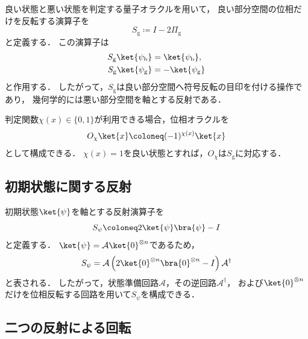 良い状態と悪い状態を判定する量子オラクルを用いて，
良い部分空間の位相だけを反転する演算子を
\begin{equation}
  S_{\mathrm{g}}
  \coloneq
  I-2\Pi_{\mathrm{g}}
  \label{eq:good-state-reflection}
\end{equation}
と定義する．
この演算子は
\begin{align*}
  S_{\mathrm{g}}\ket{\psi_{\mathrm{b}}}
  &=
  \ket{\psi_{\mathrm{b}}},\\
  S_{\mathrm{g}}\ket{\psi_{\mathrm{g}}}
  &=
  -\ket{\psi_{\mathrm{g}}}
\end{align*}
と作用する．
したがって，$S_{\mathrm{g}}$は良い部分空間へ符号反転の目印を付ける操作であり，
幾何学的には悪い部分空間を軸とする反射である．

判定関数$\chi(x)\in\{0,1\}$が利用できる場合，位相オラクルを
\begin{equation}
  O_{\chi}\ket{x}
  \coloneq
  (-1)^{\chi(x)}\ket{x}
  \label{eq:phase-oracle}
\end{equation}
として構成できる．
$\chi(x)=1$を良い状態とすれば，$O_{\chi}$は$S_{\mathrm{g}}$に対応する．

\subsection{初期状態に関する反射}
\label{subsec:initial-state-reflection}

初期状態$\ket{\psi}$を軸とする反射演算子を
\begin{equation}
  S_{\psi}
  \coloneq
  2\ket{\psi}\bra{\psi}-I
  \label{eq:initial-state-reflection}
\end{equation}
と定義する．
$\ket{\psi}=\mathcal{A}\ket{0}^{\otimes n}$であるため，
\begin{equation}
  S_{\psi}
  =
  \mathcal{A}
  \left(
    2\ket{0}^{\otimes n}\bra{0}^{\otimes n}-I
  \right)
  \mathcal{A}^{\dagger}
  \label{eq:prepared-state-reflection}
\end{equation}
と表される．
したがって，状態準備回路$\mathcal{A}$，その逆回路$\mathcal{A}^{\dagger}$，
および$\ket{0}^{\otimes n}$だけを位相反転する回路を用いて$S_{\psi}$を構成できる．

\subsection{二つの反射による回転}
\label{subsec:two-reflections-as-rotation}

